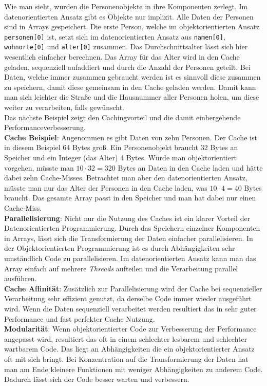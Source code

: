 Wie man sieht, wurden die Personenobjekte in ihre Komponenten zerlegt. Im datenorientierten Ansatz gibt es Objekte nur implizit. Alle Daten der Personen sind in Arrays gespeichert. Die erste Person, welche im objektorientierten Ansatz \texttt{personen[0]} ist, setzt sich im datenorientierten Ansatz aus \texttt{namen[0]}, \texttt{wohnorte[0]} und \texttt{alter[0]} zusammen. Das Durchschnittsalter lässt sich hier wesentlich einfacher berechnen. Das Array für das Alter wird in den Cache geladen, sequenziell aufaddiert und durch die Anzahl der Personen geteilt. Bei Daten, welche immer zusammen gebraucht werden ist es sinnvoll diese zusammen zu speichern, damit diese gemeinsam in den Cache geladen werden. Damit kann man sich leichter die Straße und die Hausnummer aller Personen holen, um diese weiter zu verarbeiten, falls gewünscht.\\
Das nächste Beispiel zeigt den Cachingvorteil und die damit einhergehende Performanceverbesserung.\\
\textbf{Cache Beispiel}: Angenommen es gibt Daten von zehn Personen. Der Cache ist in diesem Beispiel 64 Bytes groß. Ein Personenobjekt braucht 32 Bytes an Speicher und ein Integer (das Alter) 4 Bytes. Würde man objektorientiert vorgehen, müsste man $10 \cdot 32 = 320$ Bytes an Daten in den Cache laden und hätte dabei zehn Cache-Misses. Betrachtet man aber den datenorientierten Ansatz, müsste man nur das Alter der Personen in den Cache laden, was $10 \cdot 4 = 40$ Bytes braucht. Das gesamte Array passt in den Speicher und man hat dabei nur einen Cache-Miss.\\
\textbf{Parallelisierung}: Nicht nur die Nutzung des Caches ist ein klarer Vorteil der Datenorientierten Programmierung. Durch das Speichern einzelner Komponenten in Arrays, lässt sich die Transformierung der Daten einfacher parallelisieren. In der Objektorientierten Programmierung ist es durch Abhängigkeiten sehr umständlich Code zu parallelisieren. Im datenorientierten Ansatz kann man das Array einfach auf mehrere \textit{Threads} aufteilen und die Verarbeitung parallel ausführen.\\
\textbf{Cache Affinität}: Zusätzlich zur Parallelisierung wird der Cache bei sequenzieller Verarbeitung sehr effizient genutzt, da derselbe Code immer wieder ausgeführt wird. Wenn die Daten sequenziell verarbeitet werden resultiert das in sehr guter Performance und fast perfekter Cache Nutzung.\\
\textbf{Modularität}: Wenn objektorientierter Code zur Verbesserung der Performance angepasst wird, resultiert das oft in einem schlechter lesbarem und schlechter wartbarem Code. Das liegt an Abhängigkeiten die ein objektorientierter Ansatz oft mit sich bringt. Bei Konzentration auf die Transformierung der Daten hat man am Ende kleinere Funktionen mit weniger Abhängigkeiten zu anderem Code. Dadurch lässt sich der Code besser warten und verbessern.\\
